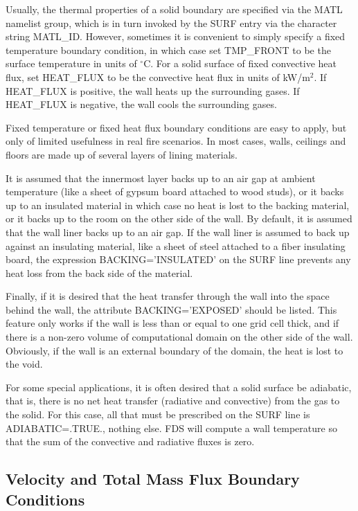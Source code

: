 \documentclass[11pt]{book}
\begin{document}
Usually, the thermal properties of a solid boundary are specified via the
{\ct MATL} namelist group, which is in turn invoked by the {\ct SURF} entry via
the character string {\ct MATL\_ID}. However, sometimes it is convenient to
simply specify a fixed temperature boundary condition, in which case set
{\ct TMP\_FRONT} to be the surface temperature in units of $^\circ$C.
For a solid surface of fixed convective heat flux, set {\ct HEAT\_FLUX} to be
the convective heat flux in units of kW/m$^2$. If {\ct HEAT\_FLUX} is
positive, the wall heats up the surrounding gases. If {\ct HEAT\_FLUX}
is negative, the wall cools the surrounding gases.

Fixed temperature or fixed heat flux boundary conditions are
easy to apply, but only of limited usefulness in real fire scenarios.
In most cases, walls, ceilings and floors are made up of several layers
of lining materials.

It is assumed that the innermost layer backs up to an air gap at ambient
temperature (like a sheet of gypsum board attached to wood studs), or
it backs up to an insulated material in which case no heat is lost to
the backing material, or it backs up to the room on the other side of
the wall. By default, it is assumed that the wall liner backs up to an air gap.
If the wall liner is assumed to back up against an insulating material,
like a sheet of steel attached to a fiber insulating board, the expression
{\ct BACKING='INSULATED'} on the {\ct SURF} line prevents any heat
loss from the back side of the material.

Finally, if it is desired that the heat transfer
through the wall into the space behind the wall, the attribute
{\ct BACKING='EXPOSED'} should be listed. This feature only works
if the wall is less than or equal to one grid cell thick, and if there is a non-zero volume
of computational domain on the other side of the wall. Obviously, if
the wall is an external boundary of the domain, the heat is lost
to the void.

For some special applications, it is often desired that a solid
surface be adiabatic, that is, there is no net heat transfer
(radiative and convective) from the gas to the solid. For this case,
all that must be prescribed on the {\ct SURF} line is {\ct
ADIABATIC=.TRUE.}, nothing else.  FDS will compute a wall temperature
so that the sum of the convective and radiative fluxes is zero.

\subsection{Velocity and Total Mass Flux Boundary Conditions}
\end{document}
